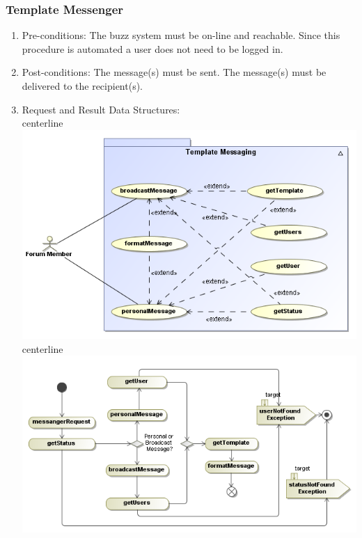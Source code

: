 \documentclass[hidelinks, 12pt, oneside]{article}
\begin{document}
\subsubsection{Template Messenger}
\begin{enumerate}
\item Pre-conditions:   The buzz system must be on-line and reachable. Since this procedure is automated a user does not need to be logged in.
\item Post-conditions:  The message(s) must be sent. The message(s) must be delivered to the recipient(s).

\item Request and Result Data Structures:\\
   centerline{\includegraphics[scale=0.4]{TempleteMessagingUseCases}}\\
 centerline{\includegraphics[scale=0.4]{TemplateMessagingActivities}} 
\end{enumerate}
\end{document}

